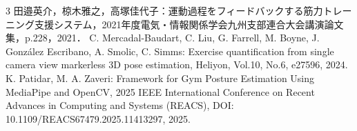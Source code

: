 \documentclass[no-page-number]{nanzan-abstract}
\begin{document}
\begin{thebibliography}{3}
田邉英介，椋木雅之，高塚佳代子：運動過程をフィードバックする筋力トレーニング支援システム，2021年度電気・情報関係学会九州支部連合大会講演論文集，p.228，2021．
C. Mercadal-Baudart, C. Liu, G. Farrell, M. Boyne, J. González Escribano, A. Smolic, C. Simms:
Exercise quantification from single camera view markerless 3D pose estimation, Heliyon, Vol.10, No.6, e27596, 2024.
K. Patidar, M. A. Zaveri:
Framework for Gym Posture Estimation Using MediaPipe and OpenCV,
2025 IEEE International Conference on Recent Advances in Computing and Systems (REACS),
DOI: 10.1109/REACS67479.2025.11413297, 2025.
\end{thebibliography}
\end{document}
